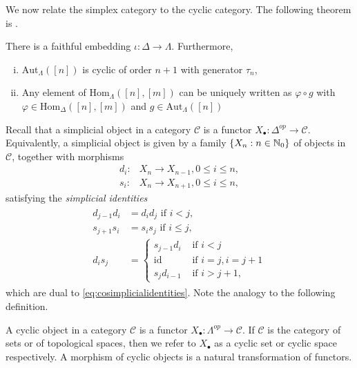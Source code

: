 We now relate the simplex category to the cyclic category. The following 
theorem is \cite[Theorem~6.1.3, \pno~203]{loday}.
\begin{thm}\label{thm:simplexcyclic}
There is a faithful embedding $\iota:\Delta\to \Lambda$. Furthermore,
\begin{enumerate}[(i)]
\item $\mathrm{Aut}_{\Lambda}([n])$ is cyclic of order $n+1$ with
generator $\tau_n$,
\item Any element of $\mathrm{Hom}_\Lambda([n],[m])$ can be uniquely written
as $\varphi\circ g$ with $\varphi \in \mathrm{Hom}_\Delta([n],[m])$
and $g\in \mathrm{Aut}_{\Lambda}([n])$
\end{enumerate}
\end{thm}

Recall that a simplicial object in a category $\mathcal{C}$ is a functor
$X_\bullet:\Delta^{op}\to \mathcal{C}$. 
Equivalently, a simplicial object is given by a family $\{X_n:n\in \mathbb{N}_0\}$
of objects in $\mathcal{C}$, together with morphisms
\begin{align}
d_i: &X_n\to X_{n-1}, 0\le i\le n,\\
s_i: &X_n \to X_{n+1}, 0\le i \le n,
\end{align} 
satisfying the \textit{simplicial identities}
\begin{align}\label{eq:simplicialidentities}
\begin{split}
d_{j-1} d_i &= d_i d_j \text{ if } i < j,\\
s_{j+1}s_i &=  s_i s_j \text{ if } i\le j,\\
d_i s_j &= 
\begin{cases} 
s_{j-1} d_i   &\text{ if } i<j\\
\mathrm{id}  &\text{ if } i=j, i = j+1\\
s_{j} d_{i-1}  &\text{ if } i>j+1,
\end{cases}
\end{split}
\end{align}
which are
dual to \eqref{eq:cosimplicialidentities}.
Note the analogy to the following definition.
\begin{mydef}
A cyclic object in a category $\mathcal{C}$ is a functor
$X_\bullet:\Lambda^{op} \to \mathcal{C}$. If $\mathcal{C}$ is the category
of sets or of topological spaces, then we refer to $X_\bullet$ as a cyclic set
or cyclic space respectively.
A morphism of cyclic objects is a natural
transformation of functors.
\end{mydef}


